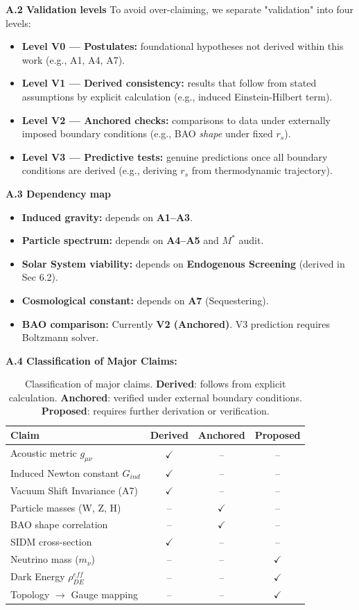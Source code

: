 \documentclass[a4paper,12pt]{article}
\begin{document}
\textbf{A.2 Validation levels}
To avoid over-claiming, we separate "validation" into four levels:
\begin{itemize}
    \item \textbf{Level V0 — Postulates:} foundational hypotheses not derived within this work (e.g., A1, A4, A7).
    \item \textbf{Level V1 — Derived consistency:} results that follow from stated assumptions by explicit calculation (e.g., induced Einstein-Hilbert term).
    \item \textbf{Level V2 — Anchored checks:} comparisons to data under externally imposed boundary conditions (e.g., BAO \emph{shape} under fixed $r_s$).
    \item \textbf{Level V3 — Predictive tests:} genuine predictions once all boundary conditions are derived (e.g., deriving $r_s$ from thermodynamic trajectory).
\end{itemize}

\textbf{A.3 Dependency map}
\begin{itemize}
    \item \textbf{Induced gravity:} depends on \textbf{A1--A3}.
    \item \textbf{Particle spectrum:} depends on \textbf{A4--A5} and $M^*$ audit.
    \item \textbf{Solar System viability:} depends on \textbf{Endogenous Screening} (derived in Sec 6.2).
    \item \textbf{Cosmological constant:} depends on \textbf{A7} (Sequestering).
    \item \textbf{BAO comparison:} Currently \textbf{V2 (Anchored)}. V3 prediction requires Boltzmann solver.
\end{itemize}

\textbf{A.4 Classification of Major Claims:}
\begin{table}[H]
\centering
\small
\begin{tabular}{lccc}
\toprule
\textbf{Claim} & \textbf{Derived} & \textbf{Anchored} & \textbf{Proposed} \\
\midrule
Acoustic metric $g_{\mu\nu}$ & $\checkmark$ & -- & -- \\
Induced Newton constant $G_{ind}$ & $\checkmark$ & -- & -- \\
Vacuum Shift Invariance (A7) & $\checkmark$ & -- & -- \\
Particle masses (W, Z, H) & -- & $\checkmark$ & -- \\
BAO shape correlation & -- & $\checkmark$ & -- \\
SIDM cross-section & $\checkmark$ & -- & -- \\
Neutrino mass ($m_\nu$) & -- & -- & $\checkmark$ \\
Dark Energy $\rho_{DE}^{eff}$ & -- & -- & $\checkmark$ \\
Topology $\to$ Gauge mapping & -- & -- & $\checkmark$ \\
\bottomrule
\end{tabular}
\caption{Classification of major claims. \textbf{Derived}: follows from explicit calculation. \textbf{Anchored}: verified under external boundary conditions. \textbf{Proposed}: requires further derivation or verification.}
\end{table}
\end{document}
